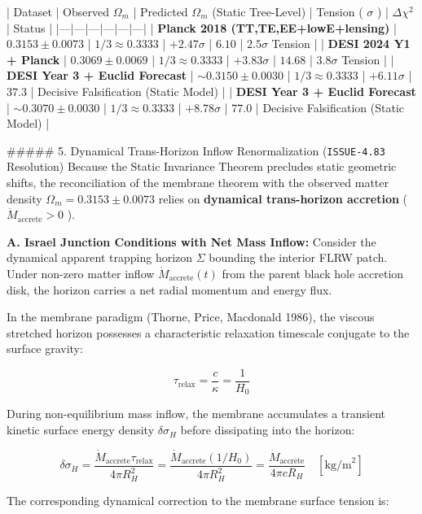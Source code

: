 \documentclass[11pt,a4paper]{article}
\theoremstyle{definition}
\theoremstyle{remark}
\begin{document}
| Dataset | Observed $\Omega_m$ | Predicted $\Omega_m$ (Static Tree-Level) | Tension ( $\sigma$ ) | $\Delta\chi^2$ | Status |
|---|---|---|---|---|---|
| \textbf{Planck 2018 (TT,TE,EE+lowE+lensing)} | $0.3153 \pm 0.0073$ | $1/3 \approx 0.3333$ | $+2.47\sigma$ | $6.10$ | $2.5\sigma$ Tension |
| \textbf{DESI 2024 Y1 + Planck} | $0.3069 \pm 0.0069$ | $1/3 \approx 0.3333$ | $+3.83\sigma$ | $14.68$ | $3.8\sigma$ Tension |
| \textbf{DESI Year 3 + Euclid Forecast} | $\sim 0.3150 \pm 0.0030$ | $1/3 \approx 0.3333$ | $+6.11\sigma$ | $37.3$ | Decisive Falsification (Static Model) |
| \textbf{DESI Year 3 + Euclid Forecast} | $\sim 0.3070 \pm 0.0030$ | $1/3 \approx 0.3333$ | $+8.78\sigma$ | $77.0$ | Decisive Falsification (Static Model) |

\#\#\#\#\# 5. Dynamical Trans-Horizon Inflow Renormalization (\texttt{ISSUE-4.83} Resolution)
Because the Static Invariance Theorem precludes static geometric shifts, the reconciliation of the membrane theorem with the observed matter density $\Omega_m = 0.3153 \pm 0.0073$ relies on \textbf{dynamical trans-horizon accretion} ( $\dot{M}_{\text{accrete}} > 0$ ).

\textbf{A. Israel Junction Conditions with Net Mass Inflow:}
Consider the dynamical apparent trapping horizon $\Sigma$ bounding the interior FLRW patch. Under non-zero matter inflow $\dot{M}_{\text{accrete}}(t)$ from the parent black hole accretion disk, the horizon carries a net radial momentum and energy flux.

In the membrane paradigm (Thorne, Price, Macdonald 1986), the viscous stretched horizon possesses a characteristic relaxation timescale conjugate to the surface gravity:


\begin{equation}
\tau_{\text{relax}} = \frac{c}{\kappa} = \frac{1}{H_0}
\end{equation}


During non-equilibrium mass inflow, the membrane accumulates a transient kinetic surface energy density $\delta\sigma_H$ before dissipating into the horizon:


\begin{equation}
\delta\sigma_H = \frac{\dot{M}_{\text{accrete}} \tau_{\text{relax}}}{4\pi R_H^2} = \frac{\dot{M}_{\text{accrete}} (1/H_0)}{4\pi R_H^2} = \frac{\dot{M}_{\text{accrete}}}{4\pi c R_H} \quad [\text{kg/m}^2]
\end{equation}


The corresponding dynamical correction to the membrane surface tension is:
\end{document}
